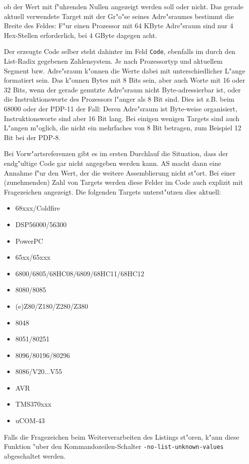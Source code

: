\documentclass[12pt,a4paper,twoside]{report}
\newcommand{\tty}[1]{{\tt #1}}
\newcommand{\asname}{AS}
\begin{document}
ob der Wert mit f"uhrenden Nullen angezeigt werden soll oder nicht.  Das
gerade aktuell verwendete Target mit der Gr"o"se seines Adre"sraumes bestimmt
die Breite des Feldes: F"ur einen Prozessor mit 64 KByte Adre"sraum sind
nur 4 Hex-Stellen erforderlich, bei 4 GByte dagegen acht.
\par
Der erzeugte Code selber steht dahinter im Feld \tty{Code}, ebenfalls
im durch den List-Radix gegebenen Zahlensystem.  Je nach Prozessortyp und
aktuellem Segment bzw. Adre"sraum k"onnen die Werte dabei mit unterschiedlicher
L"ange formatiert sein.  Das k"onnen Bytes mit 8 Bits sein, aber auch Worte
mit 16 oder 32 Bits, wenn der gerade genutzte Adre"sraum nicht Byte-adressierbar
ist, oder die Instruktionsworte des Prozessors l"anger als 8 Bit sind.  Dies
ist z.B. beim 68000 oder der PDP-11 der Fall: Deren Adre"sraum ist Byte-weise
organisiert, Instruktionsworte sind aber 16 Bit lang.  Bei einigen wenigen
Targets sind auch L"angen m"oglich, die nicht ein mehrfaches von 8 Bit betragen,
zum Beispiel 12 Bit bei der PDP-8.
\par
Bei Vorw"artsreferenzen gibt es im ersten Durchlauf die Situation, dass der
endg"ultige Code gar nicht angegeben werden kann. \asname{} macht dann eine
Annahme f"ur den Wert, der die weitere Assemblierung nicht st"ort.  Bei einer
(zunehmenden) Zahl von Targets werden diese Felder im Code auch explizit
mit Fragezeichen angezeigt.  Die folgenden Targets unterst"utzen dies aktuell:
\begin{itemize}
\item{68xxx/Coldfire}
\item{DSP56000/56300}
\item{PowerPC}
\item{65xx/65xxx}
\item{6800/6805/68HC08/6809/68HC11/68HC12}
\item{8080/8085}
\item{(e)Z80/Z180/Z280/Z380}
\item{8048}
\item{8051/80251}
\item{8096/80196/80296}
\item{8086/V20...V55}
\item{AVR}
\item{TMS370xxx}
\item{uCOM-43}
\end{itemize}
Falls die Fragezeichen beim Weiterverarbeiten des Listings st"oren, k"ann
diese Funktion "uber den Kommandozeilen-Schalter \tty{-no-list-unknown-values}
abgeschaltet werden.
\end{document}
